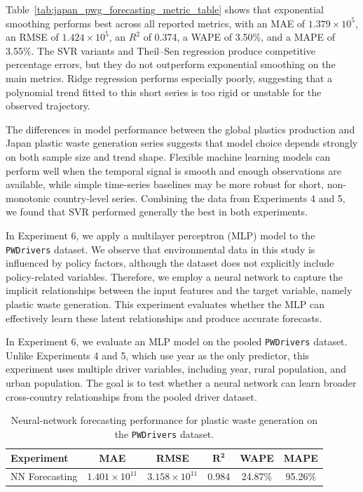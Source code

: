 Table~\ref{tab:japan_pwg_forecasting_metric_table} shows that exponential smoothing performs best across all reported metrics, with an MAE of \(1.379 \times 10^5\), an RMSE of \(1.424 \times 10^5\), an \(R^2\) of 0.374, a WAPE of 3.50\%, and a MAPE of 3.55\%. The SVR variants and Theil--Sen regression produce competitive percentage errors, but they do not outperform exponential smoothing on the main metrics. Ridge regression performs especially poorly, suggesting that a polynomial trend fitted to this short series is too rigid or unstable for the observed trajectory.

The differences in model performance between the global plastics production and Japan plastic waste generation series suggests that model choice depends strongly on both sample size and trend shape. Flexible machine learning models can perform well when the temporal signal is smooth and enough observations are available, while simple time-series baselines may be more robust for short, non-monotonic country-level series. Combining the data from Experiments 4 and 5, we found that SVR performed generally the best in both experiments.


In Experiment 6, we apply a multilayer perceptron (MLP) model to the \texttt{PWDrivers} dataset. We observe that environmental data in this study is influenced by policy factors, although the dataset does not explicitly include policy-related variables. Therefore, we employ a neural network to capture the implicit relationships between the input features and the target variable, namely plastic waste generation. This experiment evaluates whether the MLP can effectively learn these latent relationships and produce accurate forecasts.

In Experiment 6, we evaluate an MLP model on the pooled \texttt{PWDrivers} dataset. Unlike Experiments 4 and 5, which use year as the only predictor, this experiment uses multiple driver variables, including year, rural population, and urban population. The goal is to test whether a neural network can learn broader cross-country relationships from the pooled driver dataset.

\begin{table}[!ht]
	\centering
	\caption{\centering Neural-network forecasting performance for plastic waste generation on the \texttt{PWDrivers} dataset.}
	\begin{tabular}{@{}lccccc@{}}
		\toprule
		\textbf{Experiment} & \textbf{MAE}           & \textbf{RMSE}          & $\mathbf{R^2}$ & \textbf{WAPE} & \textbf{MAPE} \\
		\midrule
		NN Forecasting      & \(1.401 \times 10^11\) & \(3.158 \times 10^11\) & 0.984          & 24.87\%       & 95.26\%       \\
		\hline
	\end{tabular}
	\label{tab:nn_forecasting_metric_table}
\end{table}

